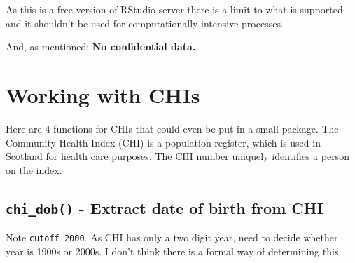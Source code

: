 \documentclass[]{book}
\newenvironment{Shaded}{\begin{snugshade}}{\end{snugshade}}
\newcommand{\CommentTok}[1]{\textcolor[rgb]{0.56,0.35,0.01}{\textit{#1}}}
\newcommand{\ControlFlowTok}[1]{\textcolor[rgb]{0.13,0.29,0.53}{\textbf{#1}}}
\newcommand{\DataTypeTok}[1]{\textcolor[rgb]{0.13,0.29,0.53}{#1}}
\newcommand{\DecValTok}[1]{\textcolor[rgb]{0.00,0.00,0.81}{#1}}
\newcommand{\KeywordTok}[1]{\textcolor[rgb]{0.13,0.29,0.53}{\textbf{#1}}}
\newcommand{\NormalTok}[1]{#1}
\newcommand{\OperatorTok}[1]{\textcolor[rgb]{0.81,0.36,0.00}{\textbf{#1}}}
\newcommand{\StringTok}[1]{\textcolor[rgb]{0.31,0.60,0.02}{#1}}
\begin{document}
As this is a free version of RStudio server there is a limit to what is supported and it shouldn't be used for computationally-intensive processes.

And, as mentioned: \textbf{No confidential data.}

\hypertarget{working-with-chis}{%
\section{Working with CHIs}\label{working-with-chis}}

Here are 4 functions for CHIs that could even be put in a small package.
The Community Health Index (CHI) is a population register, which is used in Scotland for health care purposes.
The CHI number uniquely identifies a person on the index.

\hypertarget{chi_dob---extract-date-of-birth-from-chi}{%
\subsection{\texorpdfstring{\texttt{chi\_dob()} - Extract date of birth from CHI}{chi\_dob() - Extract date of birth from CHI}}\label{chi_dob---extract-date-of-birth-from-chi}}

Note \texttt{cutoff\_2000}.
As CHI has only a two digit year, need to decide whether year is 1900s or 2000s.
I don't think there is a formal way of determining this.

\begin{Shaded}
\end{Shaded}
\end{document}
